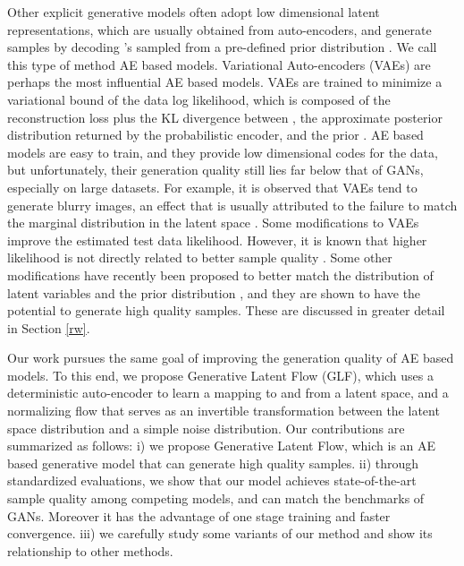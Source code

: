 \documentclass{article}
\begin{document}
Other explicit generative models often adopt low dimensional latent representations, which are usually obtained from auto-encoders, and generate samples by decoding 's sampled from a pre-defined prior distribution . We call this type of method AE based models. Variational Auto-encoders (VAEs) \citep{VAE,rezende} are perhaps the most influential AE based models. VAEs are trained to minimize a variational bound of the data log likelihood, which is composed of the reconstruction loss plus the KL divergence between , the approximate posterior distribution returned by the probabilistic encoder, and the prior . AE based models are easy to train, and they provide low dimensional codes for the data, but unfortunately, their generation quality still lies far below that of GANs, especially on large datasets. For example, it is observed that VAEs tend to generate blurry images, an effect that is usually attributed to the failure to match the marginal distribution in the latent space \citep{TwoVAE,match}. Some modifications to VAEs \citep{IWAE,impFlow1} improve the estimated test data likelihood. However, it is known that higher likelihood is not directly related to better sample quality \citep{note,flowgan}. Some other modifications have recently been proposed  to better match the distribution of latent variables and the prior distribution \citep{TwoVAE,wae,From, NAIS}, and they are shown to have the potential to generate high quality samples. These are discussed in greater detail in Section \ref{rw}. 

Our work pursues the same goal of improving the generation quality of AE based models. To this end, we propose Generative Latent Flow (GLF), which uses a deterministic auto-encoder to learn a mapping to and from a latent space, and a normalizing flow that serves as an invertible transformation between the latent space distribution and a simple noise distribution. Our contributions are summarized as follows: i) we propose Generative Latent Flow, which is an AE based generative model that can generate high quality samples. ii) through standardized evaluations, we show that our model achieves state-of-the-art sample quality among competing models, and can match the benchmarks of GANs. Moreover it has the advantage of one stage training and faster convergence. iii) we carefully study some variants of our method and show its relationship to other methods.
\end{document}
